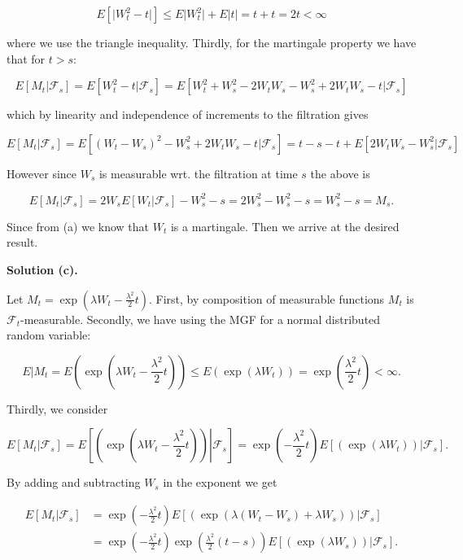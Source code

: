\documentclass[
]{book}
\begin{document}
\[E[\vert W_t^2-t\vert]\le E\vert W_t^2\vert +E\vert t\vert=t+t=2t<\infty\]

where we use the triangle inequality. Thirdly, for the martingale property we have that for \(t>s\):

\[E[M_t\vert \mathcal{F}_s]=E[W_t^2-t\vert \mathcal{F}_s]=E[W_t^2+W_s^2-2W_tW_s-W_s^2+2W_tW_s-t\vert \mathcal{F}_s]\]

which by linearity and independence of increments to the filtration gives

\[E[M_t\vert \mathcal{F}_s]=E[(W_t-W_s)^2-W_s^2+2W_tW_s-t\vert \mathcal{F}_s]=t-s-t+E[2W_tW_s-W_s^2\vert \mathcal{F}_s]\]

However since \(W_s\) is measurable wrt. the filtration at time \(s\) the above is

\[E[M_t\vert \mathcal{F}_s]=2W_sE[W_t\vert \mathcal{F}_s]-W_s^2-s=2W_s^2-W_s^2-s=W_s^2-s=M_s.\]

Since from (a) we know that \(W_t\) is a martingale. Then we arrive at the desired result.

\textbf{Solution (c).}

Let \(M_t=\exp\left(\lambda W_t-\frac{\lambda^2}{2}t\right)\). First, by composition of measurable functions \(M_t\) is \(\mathcal{F}_t\)-measurable. Secondly, we have using the MGF for a normal distributed random variable:

\[E\vert M_t=E\left(\exp\left(\lambda W_t-\frac{\lambda^2}{2}t\right)\right)\le E\left(\exp\left(\lambda W_t\right)\right)=\exp\left(\frac{\lambda^2}{2}t\right)<\infty.\]

Thirdly, we consider

\[E[M_t\vert\mathcal{F}_s]=E\left.\left[\left(\exp\left(\lambda W_t-\frac{\lambda^2}{2}t\right)\right)\right\vert\mathcal{F}_s\right]=\exp\left(-\frac{\lambda^2}{2}t\right)E\left.\left[\left(\exp\left(\lambda W_t\right)\right)\right\vert\mathcal{F}_s\right].\]

By adding and subtracting \(W_s\) in the exponent we get

\begin{align*}
E[M_t\vert\mathcal{F}_s]&=\exp\left(-\frac{\lambda^2}{2}t\right)E\left.\left[\left(\exp\left(\lambda (W_t-W_s)+\lambda W_s\right)\right)\right\vert\mathcal{F}_s\right]\\
&=\exp\left(-\frac{\lambda^2}{2}t\right)\exp\left(\frac{\lambda^2}{2}(t-s)\right)E\left.\left[\left(\exp\left(\lambda W_s\right)\right)\right\vert\mathcal{F}_s\right].
\end{align*}
\end{document}

